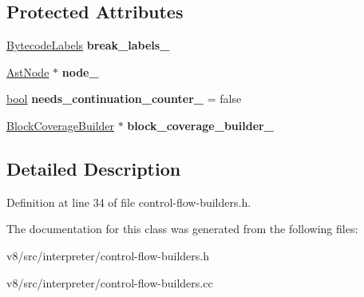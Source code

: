 \subsection*{Protected Attributes}
\begin{DoxyCompactItemize}
\item 
\mbox{\label{classv8_1_1internal_1_1interpreter_1_1BreakableControlFlowBuilder_a20ee6311600856bd0c46794fe5d63b3d}} 
\mbox{\hyperlink{classv8_1_1internal_1_1interpreter_1_1BytecodeLabels}{Bytecode\+Labels}} {\bfseries break\+\_\+labels\+\_\+}
\item 
\mbox{\label{classv8_1_1internal_1_1interpreter_1_1BreakableControlFlowBuilder_a33d9a14b910d51e8f24627657474a70c}} 
\mbox{\hyperlink{classv8_1_1internal_1_1AstNode}{Ast\+Node}} $\ast$ {\bfseries node\+\_\+}
\item 
\mbox{\label{classv8_1_1internal_1_1interpreter_1_1BreakableControlFlowBuilder_ac2abe1ece44643459ad0652f37f1f7ed}} 
\mbox{\hyperlink{classbool}{bool}} {\bfseries needs\+\_\+continuation\+\_\+counter\+\_\+} = false
\item 
\mbox{\label{classv8_1_1internal_1_1interpreter_1_1BreakableControlFlowBuilder_aca7c8e9086bca5eddd881cee9c79390a}} 
\mbox{\hyperlink{classv8_1_1internal_1_1interpreter_1_1BlockCoverageBuilder}{Block\+Coverage\+Builder}} $\ast$ {\bfseries block\+\_\+coverage\+\_\+builder\+\_\+}
\end{DoxyCompactItemize}


\subsection{Detailed Description}


Definition at line 34 of file control-\/flow-\/builders.\+h.



The documentation for this class was generated from the following files\+:\begin{DoxyCompactItemize}
\item 
v8/src/interpreter/control-\/flow-\/builders.\+h\item 
v8/src/interpreter/control-\/flow-\/builders.\+cc\end{DoxyCompactItemize}
